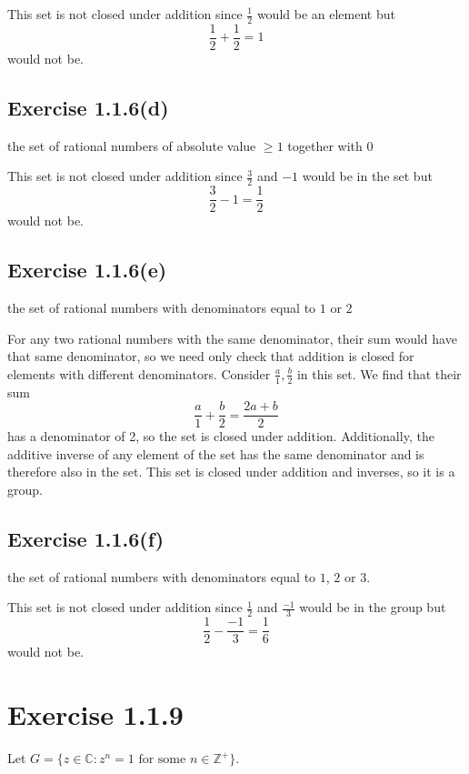 \documentclass[12pt]{article}
\newenvironment{problem}
    {\begin{lrbox}{\mybox}\begin{minipage}{\textwidth-10pt}}
    {\end{minipage}\end{lrbox}\framebox[6.5in]{\usebox{\mybox}}}
\newcommand{\ds}{\displaystyle}
\newcommand{\Z}{\mathbb{Z}}
\newcommand{\C}{\mathbb{C}}
\begin{document}
This set is not closed under addition since $\ds\frac12$ would be an element but
\[\frac12 + \frac12 = 1\]
would not be.

\subsection*{Exercise 1.1.6(d)}
\begin{problem}
    the set of rational numbers of absolute value $\geq1$ together with $0$
\end{problem}

This set is not closed under addition since $\ds\frac32$ and $-1$ would be in the set but
\[\frac32 - 1 = \frac12\]
would not be.

\subsection*{Exercise 1.1.6(e)}
\begin{problem}
    the set of rational numbers with denominators equal to $1$ or $2$
\end{problem}

For any two rational numbers with the same denominator, their sum would have that same denominator, so we need only check that addition is closed for elements with different denominators. Consider $\ds\frac a1,\frac b2$ in this set. We find that their sum
\[\frac a1 + \frac b2 = \frac{2a+b}2\]
has a denominator of 2, so the set is closed under addition. Additionally, the additive inverse of any element of the set has the same denominator and is therefore also in the set. This set is closed under addition and inverses, so it is a group.

\subsection*{Exercise 1.1.6(f)}
\begin{problem}
    the set of rational numbers with denominators equal to $1$, $2$ or $3$.
\end{problem}

This set is not closed under addition since $\ds\frac12$ and $\ds\frac{-1}3$ would be in the group but
\[\frac12 - \frac{-1}3 = \frac16\]
would not be.

\section*{Exercise 1.1.9}
\begin{problem}
    Let $G=\{z\in\C : z^n=1 \text{ for some } n\in\Z^+\}$.
\end{problem}
\end{document}
